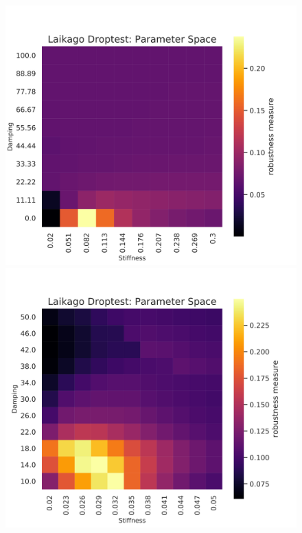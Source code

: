     \begin{figure}[h]\label{fig:}
        \centering
        \begin{minipage}{0.33\textwidth}
            \centering
            \includegraphics[width=\textwidth]{figures/droptest_ps_full_v2.png} %
        \end{minipage}\hfill
        \begin{minipage}{0.33\textwidth}
            \centering
            \includegraphics[width=\textwidth]{figures/droptest_ps_zoom1_v2.png} %

\end{minipage}
\end{figure}
